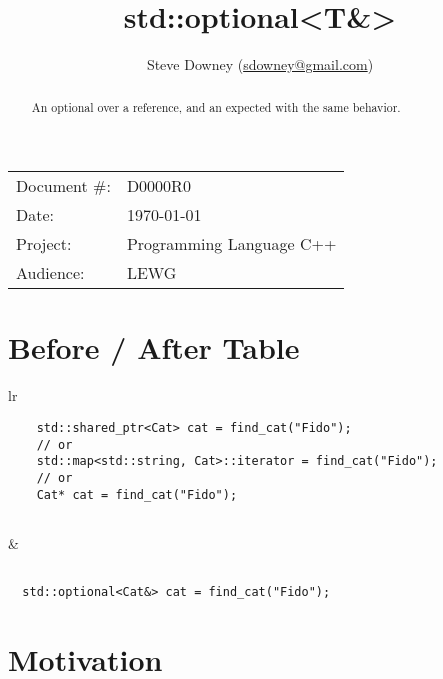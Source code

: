 \documentclass[a4paper,10pt,oneside,openany,final,article]{memoir}
\begin{document}
\title{std::optional<T&>}
\author{
Steve Downey \small(\href{mailto:sdowney@gmail.com}{sdowney@gmail.com}) \\
}
\date{} %
\maketitle

\begin{flushright}
\begin{tabular}{ll}
  Document \#: & D0000R0 \\
  Date: & \today \\
  Project: & Programming Language C++ \\
  Audience: & LEWG
\end{tabular}
\end{flushright}

\begin{abstract}
  An optional over a reference, and an expected with the same behavior.
\end{abstract}

\tableofcontents*


\chapter{Before / After Table}
\begin{tabular}{ lr }
\begin{minipage}[t]{0.45\columnwidth}
  \begin{verbatim}
    std::shared_ptr<Cat> cat = find_cat("Fido");
    // or
    std::map<std::string, Cat>::iterator = find_cat("Fido");
    // or
    Cat* cat = find_cat("Fido");


\end{verbatim}
\end{minipage}
&
\begin{minipage}[t]{0.45\columnwidth}
\begin{verbatim}

  std::optional<Cat&> cat = find_cat("Fido");

\end{verbatim}
\end{minipage}

\end{tabular}

\chapter{Motivation}
\end{document}
